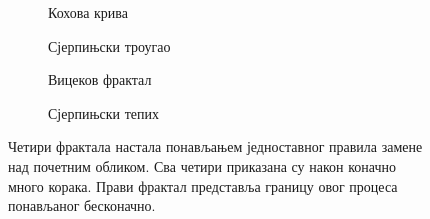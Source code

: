 \documentclass[serbian]{ftndiplomski}
\begin{document}
\begin{figure}[H]
  \centering
  \begin{subfigure}[b]{0.45\textwidth}
    \centering
    \begin{tikzpicture}[x=5cm,y=5cm]
      
    \end{tikzpicture}
    \caption{Кохова крива}
  \end{subfigure}
  \hfill
  \begin{subfigure}[b]{0.45\textwidth}
    \centering
    \begin{tikzpicture}[x=5cm,y=5cm]
      
    \end{tikzpicture}
    \caption{Сјерпињски троугао}
  \end{subfigure}

  \vspace{1em}

  \begin{subfigure}[b]{0.45\textwidth}
    \centering
    \begin{tikzpicture}[x=5cm,y=5cm]
      
    \end{tikzpicture}
    \caption{Вицеков фрактал}
  \end{subfigure}
  \hfill
  \begin{subfigure}[b]{0.45\textwidth}
    \centering
    \begin{tikzpicture}[x=5cm,y=5cm]
      
    \end{tikzpicture}
    \caption{Сјерпињски тепих}
  \end{subfigure}
  \caption{Четири фрактала настала понављањем једноставног правила замене над почетним
    обликом. Сва четири приказана су након коначно много корака. Прави фрактал
    представља границу овог процеса понављаног бесконачно.}
  \label{fig:fractal-examples}
\end{figure}
\end{document}
